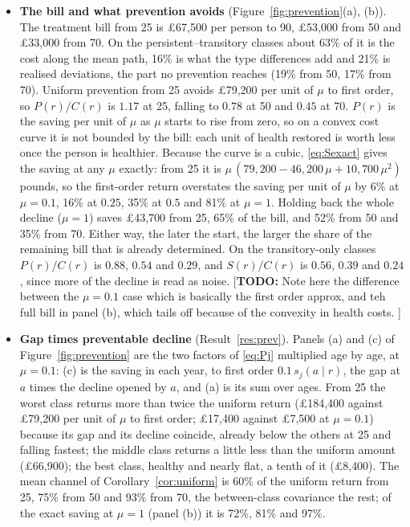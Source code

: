 \documentclass[11pt]{article}
\newcommand{\todo}[1]{\textcolor{red!75!black}{[\textbf{TODO:} #1]}}
\begin{document}
	\begin{itemize}
		\item \textbf{The bill and what prevention avoids} (Figure~\ref{fig:prevention}(a), (b)). The treatment bill from 25 is \pounds67{,}500 per person to 90, \pounds53{,}000 from 50 and \pounds33{,}000 from 70. On the persistent--transitory classes about 63\% of it is the cost along the mean path, 16\% is what the type differences add and 21\% is realised deviations, the part no prevention reaches (19\% from 50, 17\% from 70). Uniform prevention from 25 avoids \pounds79{,}200 per unit of $\mu$ to first order, so $P(r)/C(r)$ is $1.17$ at 25, falling to $0.78$ at 50 and $0.45$ at 70. $P(r)$ is the saving per unit of $\mu$ as $\mu$ starts to rise from zero, so on a convex cost curve it is not bounded by the bill: each unit of health restored is worth less once the person is healthier. Because the curve is a cubic, \eqref{eq:Sexact} gives the saving at any $\mu$ exactly: from 25 it is $\mu\,(79{,}200-46{,}200\,\mu+10{,}700\,\mu^2)$ pounds, so the first-order return overstates the saving per unit of $\mu$ by 6\% at $\mu=0.1$, 16\% at $0.25$, 35\% at $0.5$ and 81\% at $\mu=1$. Holding back the whole decline ($\mu=1$) saves \pounds43{,}700 from 25, 65\% of the bill, and 52\% from 50 and 35\% from 70. Either way, the later the start, the larger the share of the remaining bill that is already determined. On the transitory-only classes $P(r)/C(r)$ is $0.88$, $0.54$ and $0.29$, and $S(r)/C(r)$ is $0.56$, $0.39$ and $0.24$, since more of the decline is read as noise. \todo{Note here the difference between the $\mu=0.1$ case which is basically the first order approx, and teh full bill in panel (b), which tails off because of the convexity in health costs. }
		\item \textbf{Gap times preventable decline} (Result~\ref{res:prev}). Panels (a) and (c) of Figure~\ref{fig:prevention} are the two factors of \eqref{eq:Pj} multiplied age by age, at $\mu=0.1$: (c) is the saving in each year, to first order $0.1\,s_j(a\mid r)$, the gap at $a$ times the decline opened by $a$, and (a) is its sum over ages. From 25 the worst class returns more than twice the uniform return (\pounds184{,}400 against \pounds79{,}200 per unit of $\mu$ to first order; \pounds17{,}400 against \pounds7{,}500 at $\mu=0.1$) because its gap and its decline coincide, already below the others at 25 and falling fastest; the middle class returns a little less than the uniform amount (\pounds66{,}900); the best class, healthy and nearly flat, a tenth of it (\pounds8{,}400). The mean channel of Corollary~\ref{cor:uniform} is 60\% of the uniform return from 25, 75\% from 50 and 93\% from 70, the between-class covariance the rest; of the exact saving at $\mu=1$ (panel (b)) it is 72\%, 81\% and 97\%.

\end{itemize}
\end{document}
